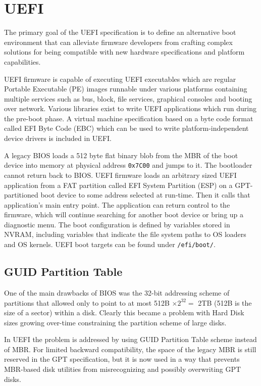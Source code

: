 \documentclass[twoside]{article}
\begin{document}
\section{UEFI}

The primary goal of the UEFI specification is to define an alternative boot environment that can alleviate firmware developers from crafting complex solutions for being compatible with new hardware specifications and platform capabilities.

UEFI firmware is capable of executing UEFI executables which are regular Portable Executable (PE) images runnable under various platforms containing multiple services such as bus, block, file services, graphical consoles and booting over network. Various libraries exist to write UEFI applications which run during the pre-boot phase. A virtual machine specification based on a byte code format called EFI Byte Code (EBC) which can be used to write platform-independent device drivers is included in UEFI.

A legacy BIOS loads a 512 byte flat binary blob from the MBR of the boot device into memory at physical address \texttt{0x7C00} and jumps to it. The bootloader cannot return back to BIOS. UEFI firmware loads an arbitrary sized UEFI application from a FAT partition called EFI System Partition (ESP) on a GPT-partitioned boot device to some address selected at run-time. Then it calls that application's main entry point. The application can return control to the firmware, which will continue searching for another boot device or bring up a diagnostic menu. The boot configuration is defined by variables stored in NVRAM, including variables that indicate the file system paths to OS loaders and OS kernels. UEFI boot targets can be found under \texttt{/efi/boot/}.

\subsection{GUID Partition Table}

One of the main drawbacks of BIOS was the 32-bit addressing scheme of partitions that allowed only to point to at most 512B $\times 2^{32} =$ 2TB (512B is the size of a sector) within a disk. Clearly this became a problem with Hard Disk sizes growing over-time constraining the partition scheme of large disks.

In UEFI the problem is addressed by using GUID Partition Table scheme instead of MBR. For limited backward compatibility, the space of the legacy MBR is still reserved in the GPT specification, but it is now used in a way that prevents MBR-based disk utilities from misrecognizing and possibly overwriting GPT disks.
\end{document}
